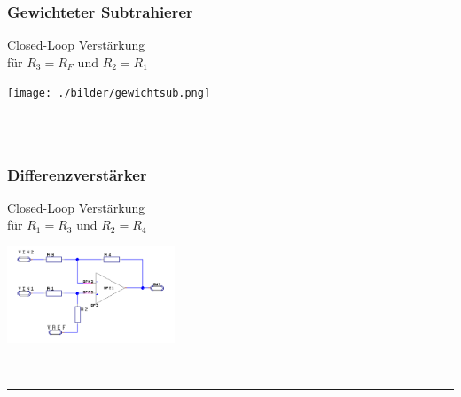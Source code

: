 	\subsubsection{Gewichteter Subtrahierer}
		\begin{minipage}[T]{13cm}
      Closed-Loop Verst\"arkung
      \hspace{3mm}\\
      f\"ur $R_3 = R_F$ und $R_2 = R_1$
      \hspace{0.1mm} 
    \end{minipage}
		\begin{minipage}{6cm}
      \texttt{[image: ./bilder/gewichtsub.png]}
    \end{minipage}\\		
\hrule

	\subsubsection{Differenzverstärker}
    \begin{minipage}[T]{14cm}
      Closed-Loop Verst\"arkung
      \hspace{3mm}\\
      f\"ur $R_1 = R_3$ und $R_2 = R_4$
      \hspace{1mm} 
    \end{minipage}
    \begin{minipage}{5cm}
      \includegraphics[width=5cm]{./bilder/differenzver.png}
    \end{minipage}\\
\hrule
        
